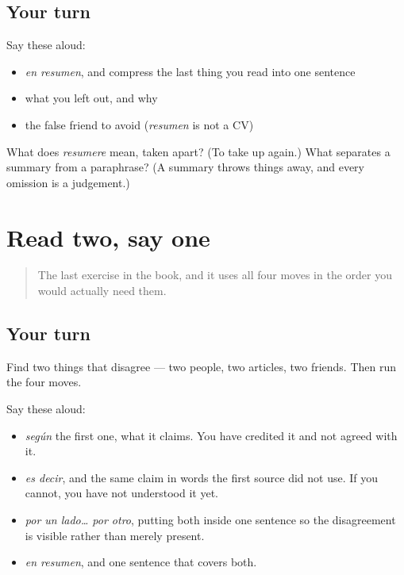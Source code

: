 \subsection*{Your turn}
Say these aloud:

\begin{itemize}
\raggedright
  \item \emph{en resumen}, and compress the last thing you read into one sentence
  \item what you left out, and why
  \item the false friend to avoid (\emph{resumen} is not a CV)
\end{itemize}

\begin{tcolorbox}[breakable,colback=teal!4,colframe=teal!35!black,title={Before you move on}]
What does \emph{resumere} mean, taken apart? (To take up again.) What separates a summary from a paraphrase? (A summary throws things away, and every omission is a judgement.)
\end{tcolorbox}
\section[Practice]{Read two, say one}

\label{lesson:ES-C277-practice}



\begin{quote}
The last exercise in the book, and it uses all four moves in the order you would actually need them.
\end{quote}

\subsection*{Your turn}
Find two things that disagree — two people, two articles, two friends. Then run the four moves.

Say these aloud:

\begin{itemize}
\raggedright
  \item \emph{según} the first one, what it claims. You have credited it and not agreed with it.
  \item \emph{es decir}, and the same claim in words the first source did not use. If you cannot, you have not understood it yet.
  \item \emph{por un lado… por otro}, putting both inside one sentence so the disagreement is visible rather than merely present.
  \item \emph{en resumen}, and one sentence that covers both.
\end{itemize}

